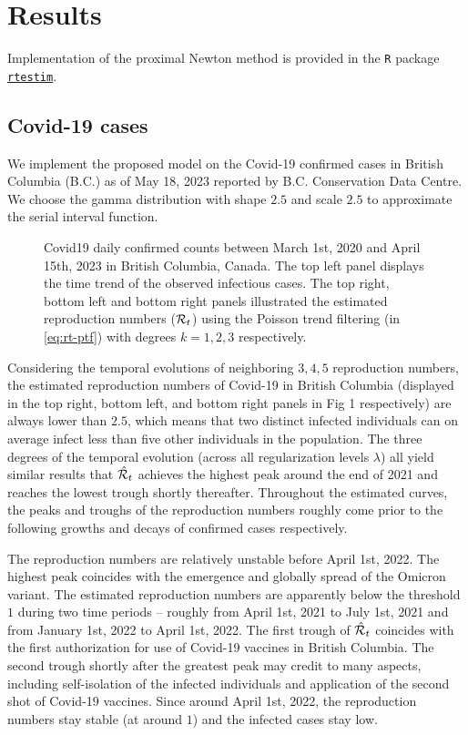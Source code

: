 \section{Results}

Implementation of the proximal Newton method is provided in the \texttt{R} package \href{https://dajmcdon.github.io/rtestim/}{\texttt{rtestim}}. 

\subsection{Covid-19 cases}

We implement the proposed model on the Covid-19 confirmed cases in British Columbia (B.C.) as of May 18, 2023 reported by B.C. Conservation Data Centre. We choose the gamma distribution with shape $2.5$ and scale $2.5$ to approximate the serial interval function.

\begin{figure}[tb]
    \centering
    \caption{Covid19 daily confirmed counts between March 1st, 2020 and April 15th, 2023 in British Columbia, Canada. The top left panel displays the time trend of the observed infectious cases. The top right, bottom left and bottom right panels illustrated the estimated reproduction numbers ($\mathcal{R}_t$) using the Poisson trend filtering (in \eqref{eq:rt-ptf}) with degrees $k=1,2,3$ respectively.} 
\end{figure}

Considering the temporal evolutions of neighboring $3, 4, 5$ reproduction numbers, the estimated reproduction numbers of Covid-19 in British Columbia (displayed in the top right, bottom left, and bottom right panels in Fig 1 respectively) are always lower than $2.5$, which means that two distinct infected individuals can on average infect less than five other individuals in the population. The three degrees of the temporal evolution (across all regularization levels $\lambda$) all yield similar results that $\hat{\mathcal{R}}_t$ achieves the highest peak around the end of 2021 and reaches the lowest trough shortly thereafter. Throughout the estimated curves, the peaks and troughs of the reproduction numbers roughly come prior to the following growths and decays of confirmed cases respectively.

The reproduction numbers are relatively unstable before April 1st, 2022.
The highest peak coincides with the emergence and globally spread of the Omicron variant. The estimated reproduction numbers are apparently below the threshold $1$ during two time periods -- roughly from April 1st, 2021 to July 1st, 2021 and from January 1st, 2022 to April 1st, 2022. The first trough of $\hat{\mathcal{R}}_t$ coincides with the first authorization for use of Covid-19 vaccines in British Columbia. The second trough shortly after the greatest peak may credit to many aspects, including self-isolation of the infected individuals and application of the second shot of Covid-19 vaccines. 
Since around April 1st, 2022, the reproduction numbers stay stable (at around $1$) and the infected cases stay low. 

